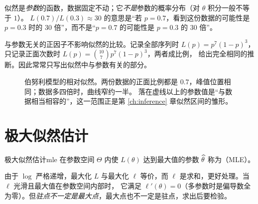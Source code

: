 \begin{warning}
似然是\emph{参数}的函数，数据固定不动；它\emph{不是}参数的概率分布（对 $\theta$ 积分一般不等于 $1$）。
$L(0.7)/L(0.3)\approx30$ 的意思是“若 $p=0.7$，看到这份数据的可能性是 $p=0.3$ 时的 30 倍”，而不是“$p=0.7$ 的可能性是 $p=0.3$ 的 30 倍”。
\end{warning}

与参数无关的正因子不影响似然的比较。记录全部序列时 $L(p)=p^7(1-p)^3$，只记录正面次数时 $L(p)=\binom{10}{7}p^7(1-p)^3$，两者成比例，
给出完全相同的推断。因此常常只写出似然中与参数有关的部分。

\begin{figure}[H]
\centering
{}
\caption{伯努利模型的相对似然。两份数据的正面比例都是 $0.7$，峰值位置相同；数据多四倍时，曲线窄约一半。
落在虚线以上的参数值是“与数据相当相容的”，这一范围正是第 \ref{ch:inference} 章似然区间的雏形。}
\label{fig:lik}
\end{figure}

\section{极大似然估计}

\begin{definition}{极大似然估计}{mle}
在参数空间 $\Theta$ 内使 $L(\theta)$ 达到最大值的参数 $\widehat{\theta}$ 称为（MLE）。
\end{definition}

由于 $\log$ 严格递增，最大化 $L$ 与最大化 $\ell$ 等价，而 $\ell$ 是求和，更好处理。当 $\ell$ 光滑且最大值在参数空间内部时，
它满足 $\ell'(\theta)=0$（多参数时是偏导数全为零）。但\emph{驻点不一定是最大点}，最大点也不一定是驻点，求出后要检验。

